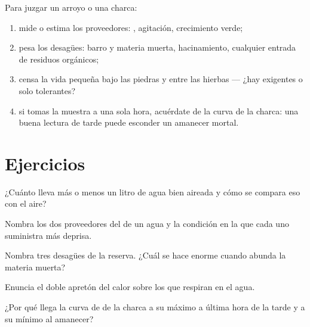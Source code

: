 \begin{method}\label{met:g7:oxygen-in-the-water:judge}
Para juzgar un arroyo o una charca:
\begin{enumerate}
  \item mide o estima los proveedores: , agitación,
        crecimiento verde;
  \item pesa los desagües: barro y materia muerta, hacinamiento,
        cualquier entrada de residuos orgánicos;
  \item censa la vida pequeña bajo las piedras y entre las hierbas ---
        ¿hay  exigentes o solo tolerantes?
  \item si tomas la muestra a una sola hora, acuérdate de la curva de
        la charca: una buena lectura de tarde puede esconder un
        amanecer mortal.
\end{enumerate}
\end{method}

\section{Ejercicios}

\begin{exercise}[$\star$]\label{exo:g7:oxygen-in-the-water:1}
¿Cuánto  lleva más o menos un litro de agua bien aireada y cómo
se compara eso con el aire?
\end{exercise}

\begin{exercise}[$\star$]\label{exo:g7:oxygen-in-the-water:2}
Nombra los dos proveedores del  de un agua y la condición en la
que cada uno suministra más deprisa.
\end{exercise}

\begin{exercise}[$\star$]\label{exo:g7:oxygen-in-the-water:3}
Nombra tres desagües de la reserva. ¿Cuál se hace enorme cuando abunda
la materia muerta?
\end{exercise}

\begin{exercise}[$\star$]\label{exo:g7:oxygen-in-the-water:4}
Enuncia el doble apretón del calor sobre los que respiran en el agua.
\end{exercise}

\begin{exercise}[$\star$]\label{exo:g7:oxygen-in-the-water:5}
¿Por qué llega la curva de  de la charca a su máximo a última
hora de la tarde y a su mínimo al amanecer?
\end{exercise}

